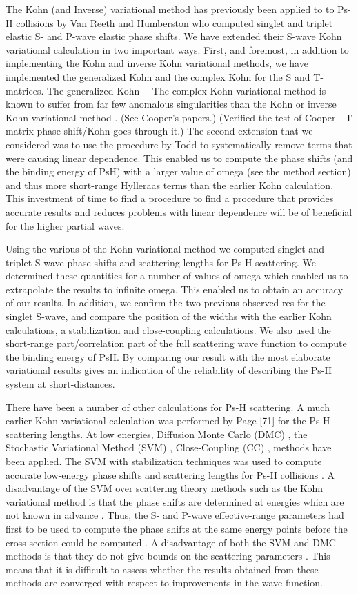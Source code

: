 \documentclass[preprint,showpacs,preprintnumbers,amsmath,amssymb]{revtex4}
\begin{document}
The Kohn (and Inverse) variational method has previously been applied to
to Ps-H collisions by 
Van Reeth and Humberston \cite{} who computed singlet and triplet elastic
S- and P-wave elastic phase shifts. 
We have extended their S-wave Kohn variational calculation in two important ways.
First, and foremost, in addition to implementing
the Kohn and inverse Kohn variational methods, we have
implemented the generalized Kohn and the complex Kohn
for the S and T-matrices. The generalized Kohn---
The complex Kohn variational method is known to suffer
from far few anomalous singularities than the
Kohn or inverse Kohn variational method \cite{}. 
(See Cooper's papers.) (Verified the test of Cooper---T matrix
phase shift/Kohn goes through it.)
The second extension that we considered was to use
the procedure by Todd to systematically remove terms that
were causing linear dependence.
This enabled us to compute the phase shifts (and the binding
energy of PsH) with a larger value of omega (see the method section)
and thus more short-range Hylleraas terms than the earlier 
Kohn calculation. 
This investment of time to find a procedure to find
a procedure that provides accurate results
and reduces problems with linear dependence
will be of beneficial for the higher partial waves.

Using the various of the Kohn variational method we 
computed singlet and triplet S-wave 
phase shifts and scattering lengths for Ps-H scattering.
We determined these quantities for a number of values
of omega which enabled us to
extrapolate the results to infinite omega.
This enabled us to obtain an accuracy of our results.
In addition, we confirm the two previous observed res
for the singlet S-wave, and compare the
position of the widths with the earlier Kohn calculations,
a stabilization and close-coupling calculations.
We also used the short-range part/correlation part of
the full scattering wave function to compute
the binding energy of PsH.
By comparing our result with the most elaborate
variational results gives an indication of the
reliability  of describing the Ps-H system
at short-distances.

There have been a number of other calculations for
Ps-H scattering. A much earlier Kohn variational calculation was performed
by Page [71] for the Ps-H scattering lengths.
At low energies, Diffusion Monte Carlo (DMC) \cite{},
the Stochastic  Variational Method (SVM) \cite{},  Close-Coupling (CC) \cite{}, 
 methods have been applied.
The SVM with stabilization techniques was used to compute
accurate low-energy phase shifts and scattering lengths for Ps-H collisions \cite{}.
A disadvantage of the SVM over scattering theory methods
such as the Kohn variational method is that the phase shifts
are  determined at energies which  are not  known in advance \cite{}.
Thus,  the S- and P-wave
effective-range parameters had first to be used to compute the phase shifts at the same energy
points before the cross section could be computed \cite{}. 
A disadvantage of both the SVM 
and DMC  methods is that they do not  give
bounds on the scattering parameters \cite{}.
This means that it is difficult to assess whether the results
obtained from these methods are converged with respect
to improvements in the wave function.
\end{document}
